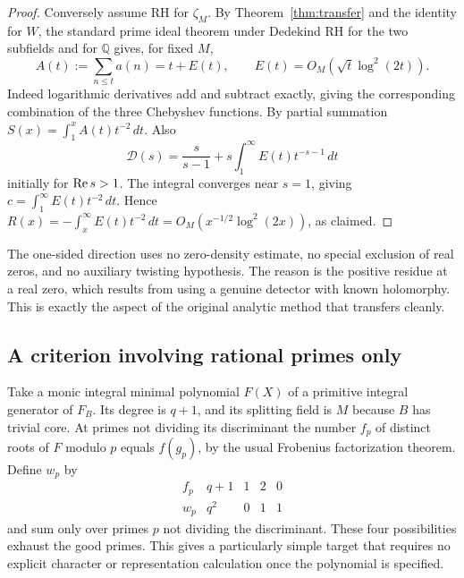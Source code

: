 \documentclass[11pt]{article}
\theoremstyle{remark}\newtheorem{remark}[theorem]{Remark}
\newcommand{\Q}{\mathbb Q}\newcommand{\C}{\mathbb C}\newcommand{\F}{\mathbb F}\newcommand{\one}{\mathbf 1}\newcommand{\St}{\mathrm{St}}\newcommand{\Gg}{\Gamma}\newcommand{\PT}{\mathcal P}\newcommand{\eps}{\varepsilon}
\begin{document}
\begin{proof}
Conversely assume RH for $\zeta_M$. By Theorem~\ref{thm:transfer} and the identity for $W$, the standard prime ideal theorem under Dedekind RH \cite{grenie} for the two subfields and for $\Q$ gives, for fixed $M$,
\[
 A(t):=\sum_{n\le t}a(n)=t+E(t),\qquad E(t)=O_M(\sqrt t\log^2(2t)).
\]
Indeed logarithmic derivatives add and subtract exactly, giving the corresponding combination of the three Chebyshev functions. By partial summation $S(x)=\int_1^x A(t)t^{-2}\,dt$. Also
\[
 \mathcal D(s)=\frac{s}{s-1}+s\int_1^\infty E(t)t^{-s-1}\,dt
\]
initially for $\operatorname{Re} s>1$. The integral converges near $s=1$, giving $c=\int_1^\infty E(t)t^{-2}\,dt$. Hence $R(x)=-\int_x^\infty E(t)t^{-2}\,dt=O_M(x^{-1/2}\log^2(2x))$, as claimed.
\end{proof}
The one-sided direction uses no zero-density estimate, no special exclusion of real zeros, and no auxiliary twisting hypothesis. The reason is the positive residue at a real zero, which results from using a genuine detector with known holomorphy. This is exactly the aspect of the original analytic method that transfers cleanly.

\subsection{A criterion involving rational primes only}
Take a monic integral minimal polynomial $F(X)$ of a primitive integral generator of $F_B$. Its degree is $q+1$, and its splitting field is $M$ because $B$ has trivial core. At primes not dividing its discriminant the number $f_p$ of distinct roots of $F$ modulo $p$ equals $f(g_p)$, by the usual Frobenius factorization theorem. Define $w_p$ by
\begin{equation}\label{eq:primeweights}
\begin{array}{c|cccc}
 f_p&q+1&1&2&0\\\hline
 w_p&q^2&0&1&1
\end{array}
\end{equation}
and sum only over primes $p$ not dividing the discriminant. These four possibilities exhaust the good primes. This gives a particularly simple target that requires no explicit character or representation calculation once the polynomial is specified.
\end{document}
